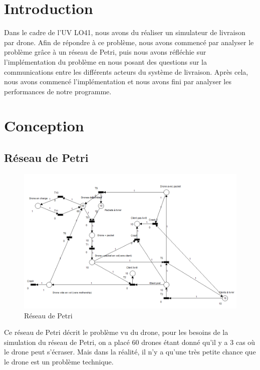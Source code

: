 \documentclass[article, backcover, french, nodocumentinfo]{upmethodology-document}
\begin{document}
	\upmdocumentsummary{}
	\upmdocumentauthors{}
	\upmdocumentinformedpeople{}
	\upmpublicationpage{}
	\thispagestyle{empty}
	\tableofcontents{}
	\newpage{}
	\section{Introduction}
		Dans le cadre de l'UV LO41, nous avons du réaliser un simulateur de livraison
		par drone. Afin de répondre à ce problème, nous avons commencé par analyser le
		problème grâce à un réseau de Petri, puis nous avons réfléchie sur l'implémentation
		du problème en nous posant des questions sur la communications entre les différents
		acteurs du système de livraison. Après cela, nous avons commencé l'implémentation et
		nous avons fini par analyser les performances de notre programme.
	\section{Conception}
		\subsection{Réseau de Petri}
			\begin{figure}[H]
			  \centering
			  \includegraphics[width=\textwidth]{figures/petri_drones}
			  \caption{Réseau de Petri}
			  \label{fig:petrinet}
			\end{figure}
			Ce réseau de Petri décrit le problème vu du drone, pour les besoins de la
			simulation du réseau de Petri, on a placé 60 drones étant donné qu'il y a 3
			cas où le drone peut s'écraser. Mais dans la réalité, il n'y a qu'une très
			petite chance que le drone est un problème technique.
\end{document}
